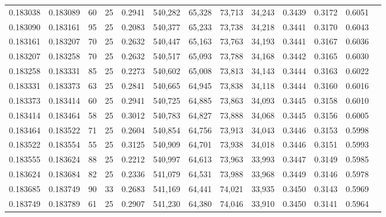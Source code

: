 \begin{tabular}{rrrrrrrrrrrrr}
0.183038 & 0.183089 &    60 &  25 &                                     0.2941 & 540,282 &  65,328 &  73,713 &  34,243 & 0.3439 & 0.3172 & 0.6051 \\
0.183090 & 0.183161 &    95 &  25 &                                     0.2083 & 540,377 &  65,233 &  73,738 &  34,218 & 0.3441 & 0.3170 & 0.6043 \\
0.183161 & 0.183207 &    70 &  25 &                                     0.2632 & 540,447 &  65,163 &  73,763 &  34,193 & 0.3441 & 0.3167 & 0.6036 \\
0.183207 & 0.183258 &    70 &  25 &                                     0.2632 & 540,517 &  65,093 &  73,788 &  34,168 & 0.3442 & 0.3165 & 0.6030 \\
0.183258 & 0.183331 &    85 &  25 &                                     0.2273 & 540,602 &  65,008 &  73,813 &  34,143 & 0.3444 & 0.3163 & 0.6022 \\
0.183331 & 0.183373 &    63 &  25 &                                     0.2841 & 540,665 &  64,945 &  73,838 &  34,118 & 0.3444 & 0.3160 & 0.6016 \\
0.183373 & 0.183414 &    60 &  25 &                                     0.2941 & 540,725 &  64,885 &  73,863 &  34,093 & 0.3445 & 0.3158 & 0.6010 \\
0.183414 & 0.183464 &    58 &  25 &                                     0.3012 & 540,783 &  64,827 &  73,888 &  34,068 & 0.3445 & 0.3156 & 0.6005 \\
0.183464 & 0.183522 &    71 &  25 &                                     0.2604 & 540,854 &  64,756 &  73,913 &  34,043 & 0.3446 & 0.3153 & 0.5998 \\
0.183522 & 0.183554 &    55 &  25 &                                     0.3125 & 540,909 &  64,701 &  73,938 &  34,018 & 0.3446 & 0.3151 & 0.5993 \\
0.183555 & 0.183624 &    88 &  25 &                                     0.2212 & 540,997 &  64,613 &  73,963 &  33,993 & 0.3447 & 0.3149 & 0.5985 \\
0.183624 & 0.183684 &    82 &  25 &                                     0.2336 & 541,079 &  64,531 &  73,988 &  33,968 & 0.3449 & 0.3146 & 0.5978 \\
0.183685 & 0.183749 &    90 &  33 &                                     0.2683 & 541,169 &  64,441 &  74,021 &  33,935 & 0.3450 & 0.3143 & 0.5969 \\
0.183749 & 0.183789 &    61 &  25 &                                     0.2907 & 541,230 &  64,380 &  74,046 &  33,910 & 0.3450 & 0.3141 & 0.5964 \\

\end{tabular}
